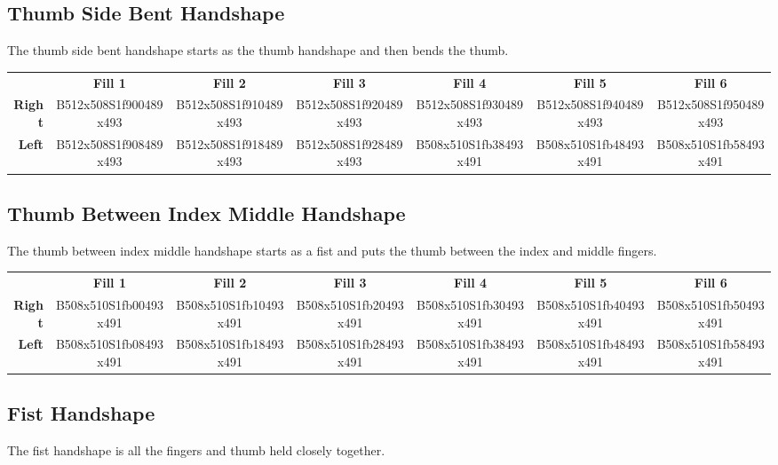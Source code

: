 \documentclass{article}
\begin{document}
\subsection{Thumb Side Bent Handshape}

The thumb side bent handshape starts as the thumb handshape and then bends the thumb.

\begin{center}
\begin{tabular}{r*{6}{c}}
&\textbf{Fill 1}&\textbf{Fill 2}&\textbf{Fill 3}&\textbf{Fill 4}&\textbf{Fill 5}&\textbf{Fill 6}\\
\textbf{Right}&
B512x508S1f900489x493&
B512x508S1f910489x493&
B512x508S1f920489x493&
B512x508S1f930489x493&
B512x508S1f940489x493&
B512x508S1f950489x493\\
\textbf{Left}&
B512x508S1f908489x493&
B512x508S1f918489x493&
B512x508S1f928489x493&
B508x510S1fb38493x491&
B508x510S1fb48493x491&
B508x510S1fb58493x491\\
\end{tabular}
\end{center}

\subsection{Thumb Between Index Middle Handshape}

The thumb between index middle handshape starts as a fist and puts the thumb between the index and middle fingers.

\begin{center}
\begin{tabular}{r*{6}{c}}
&\textbf{Fill 1}&\textbf{Fill 2}&\textbf{Fill 3}&\textbf{Fill 4}&\textbf{Fill 5}&\textbf{Fill 6}\\
\textbf{Right}&
B508x510S1fb00493x491&
B508x510S1fb10493x491&
B508x510S1fb20493x491&
B508x510S1fb30493x491&
B508x510S1fb40493x491&
B508x510S1fb50493x491\\
\textbf{Left}&
B508x510S1fb08493x491&
B508x510S1fb18493x491&
B508x510S1fb28493x491&
B508x510S1fb38493x491&
B508x510S1fb48493x491&
B508x510S1fb58493x491\\
\end{tabular}
\end{center}

\subsection{Fist Handshape}

The fist handshape is all the fingers and thumb held closely together.
\end{document}
